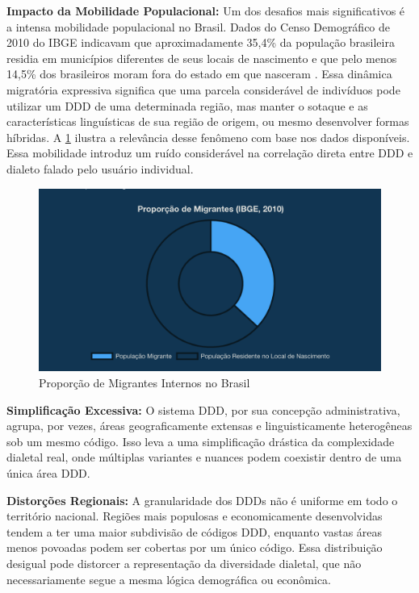 \textbf{Impacto da Mobilidade Populacional:} Um dos desafios mais significativos é a intensa mobilidade populacional no Brasil. Dados do Censo Demográfico de 2010 do IBGE indicavam que aproximadamente 35,4\% da população brasileira residia em municípios diferentes de seus locais de nascimento \cite{noauthor_ibge_nodate} e que pelo menos 14,5\% dos brasileiros moram fora do estado em que nasceram \cite{g1_145_2012}. Essa dinâmica migratória expressiva significa que uma parcela considerável de indivíduos pode utilizar um DDD de uma determinada região, mas manter o sotaque e as características linguísticas de sua região de origem, ou mesmo desenvolver formas híbridas. A \ref{fig:gradico-migracoes} ilustra a relevância desse fenômeno com base nos dados disponíveis. Essa mobilidade introduz um ruído considerável na correlação direta entre DDD e dialeto falado pelo usuário individual.


\begin{figure}
    \centering
    \includegraphics[width=0.8\linewidth]{images/grafico-dos-migrantes.png}
    \caption{Proporção de Migrantes Internos no Brasil}
    \label{fig:gradico-migracoes}
\end{figure}



\textbf{Simplificação Excessiva:} O sistema DDD, por sua concepção administrativa, agrupa, por vezes, áreas geograficamente extensas e linguisticamente heterogêneas sob um mesmo código. Isso leva a uma simplificação drástica da complexidade dialetal real, onde múltiplas variantes e nuances podem coexistir dentro de uma única área DDD.

\textbf{Distorções Regionais:} A granularidade dos DDDs não é uniforme em todo o território nacional. Regiões mais populosas e economicamente desenvolvidas tendem a ter uma maior subdivisão de códigos DDD, enquanto vastas áreas menos povoadas podem ser cobertas por um único código. Essa distribuição desigual pode distorcer a representação da diversidade dialetal, que não necessariamente segue a mesma lógica demográfica ou econômica.

